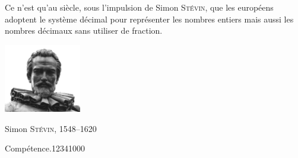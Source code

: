 {\begin{His}
{Ce n'est qu'au \ieme siècle, sous l'impulsion de Simon \textsc{Stévin},
 que les européens adoptent le système
 décimal pour représenter les nombres entiers mais aussi les nombres
 décimaux sans utiliser de fraction.}
\parbox[t]{0.39\textwidth}{
\begin{center}
\includegraphics[height=3cm]{FIG/stevin}

Simon \textsc{Stévin}, 1548--1620
\end{center}
} 

\end{His}

\begin{ExoDec}{Compétence.}{1234}{1}{0}{0}{0}
\end{ExoDec}
}


